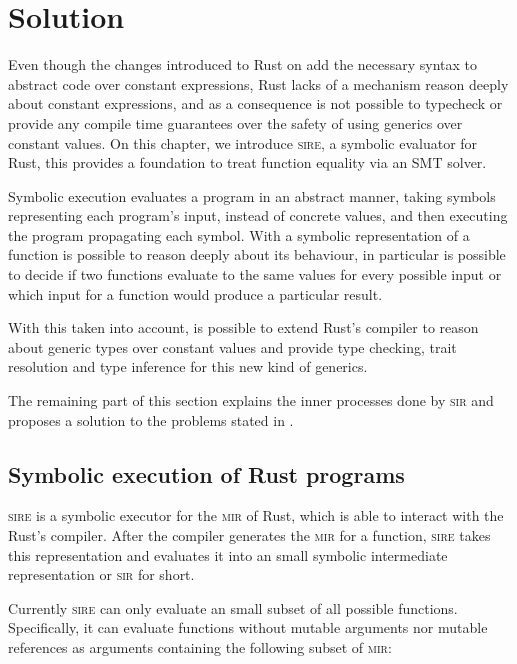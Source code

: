 \chapter{Solution}
\label{chap:solution}

Even though the changes introduced to Rust on  add the
necessary syntax to abstract code over constant expressions, Rust lacks of a
mechanism reason deeply about constant expressions, and as a consequence is not
possible to typecheck or provide any compile time guarantees over the safety of
using generics over constant values.  On this chapter, we introduce
\textsc{sire}, a symbolic evaluator for Rust, this provides a foundation to
treat function equality via an SMT solver. 

Symbolic execution evaluates a program in an abstract manner, taking symbols
representing each program's input, instead of concrete values, and then
executing the program propagating each symbol. With a symbolic representation
of a function is possible to reason deeply about its behaviour, in particular
is possible to decide if two functions evaluate to the same values for every
possible input or which input for a function would produce a particular result.

With this taken into account, is possible to extend Rust's compiler to
reason about generic types over constant values and provide type checking,
trait resolution and type inference for this new kind of generics.

The remaining part of this section explains the inner processes done by
\textsc{sir} and proposes a solution to the problems stated in
.

\section{Symbolic execution of Rust programs}
\label{sec:symbolic_execution}

\textsc{sire} is a symbolic executor for the \textsc{mir} of Rust, which is
able to interact with the Rust's compiler. After the compiler generates the
\textsc{mir} for a function, \textsc{sire} takes this representation and
evaluates it into an small symbolic intermediate representation or \textsc{sir}
for short.

Currently \textsc{sire} can only evaluate an small subset of all possible
functions. Specifically, it can evaluate functions without mutable arguments nor
mutable references as arguments containing the following subset of \textsc{mir}:

